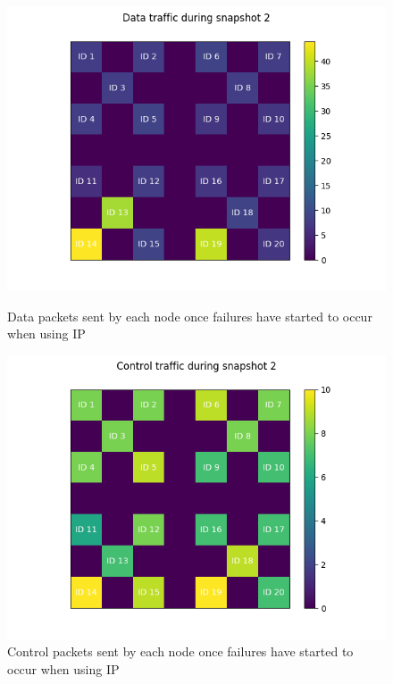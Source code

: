 \documentclass[12pt]{article}
\begin{document}
\begin{figure}[!ht]
    \centering
    \begin{minipage}{0.45\textwidth}
        \centering
        \includegraphics[width=\textwidth]{images/ip/snapshot2-Data.png} %
        \caption{Data packets sent by each node once failures have started to occur when using IP}
        \label{fig:ipdatasnapthree}
    \end{minipage}\hfill
    \begin{minipage}{0.45\textwidth}
        \centering
        \includegraphics[width=\textwidth]{images/ip/snapshot2-Control.png} %
        \caption{Control packets sent by each node once failures have started to occur when using IP}
        \label{fig:ipctrlsnapthree}
    \end{minipage}
\end{figure}
\end{document}
